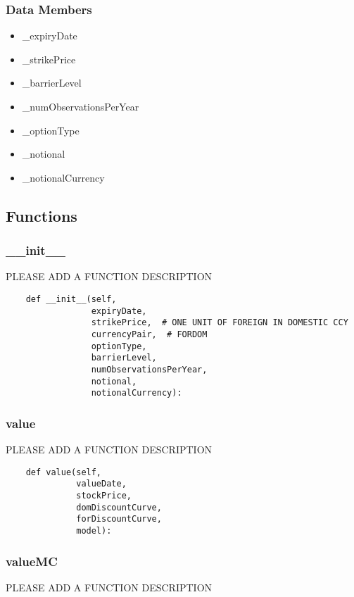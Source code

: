 \documentclass[twoside,11pt]{book}
\begin{document}
\subsubsection*{Data Members}
\begin{itemize}
\item{\_expiryDate}
\item{\_strikePrice}
\item{\_barrierLevel}
\item{\_numObservationsPerYear}
\item{\_optionType}
\item{\_notional}
\item{\_notionalCurrency}
\end{itemize}

\subsection*{Functions}

\subsubsection*{{\bf \_\_init\_\_}}
PLEASE ADD A FUNCTION DESCRIPTION

\begin{lstlisting}
    def __init__(self,
                 expiryDate,
                 strikePrice,  # ONE UNIT OF FOREIGN IN DOMESTIC CCY
                 currencyPair,  # FORDOM
                 optionType,
                 barrierLevel,
                 numObservationsPerYear,
                 notional,
                 notionalCurrency):
\end{lstlisting}

\subsubsection*{{\bf value}}
PLEASE ADD A FUNCTION DESCRIPTION

\begin{lstlisting}
    def value(self,
              valueDate,
              stockPrice,
              domDiscountCurve,
              forDiscountCurve,
              model):
\end{lstlisting}

\subsubsection*{{\bf valueMC}}
PLEASE ADD A FUNCTION DESCRIPTION
\end{document}
